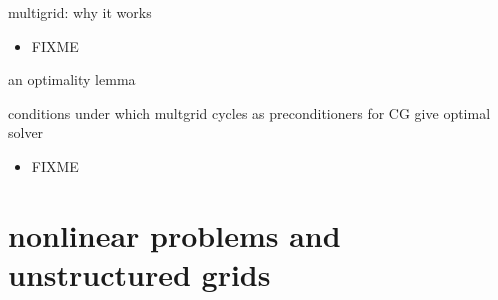 \documentclass[hide notes,intlimits,usenames,dvipsnames]{beamer}
\begin{document}
\begin{frame}{multigrid: why it works}
\begin{itemize}
\item FIXME
\end{itemize}
\end{frame}


\begin{frame}{an optimality lemma}

conditions under which multgrid cycles as preconditioners for CG give optimal solver
\begin{itemize}
\item FIXME
\end{itemize}
\end{frame}


\section{nonlinear problems and unstructured grids}
\end{document}
